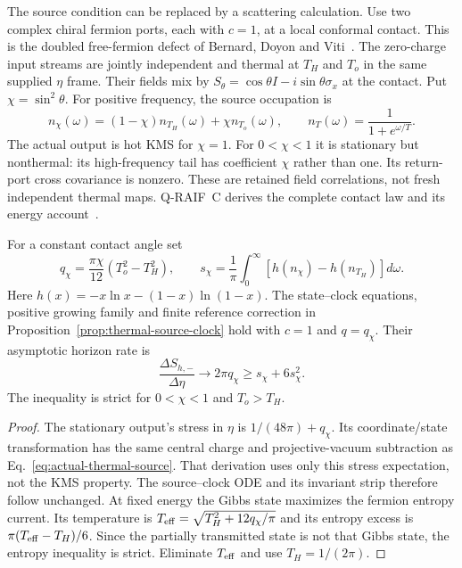 The source condition can be replaced by a scattering calculation. Use
two complex chiral fermion ports, each with $c=1$, at a local conformal
contact. This is the doubled free-fermion defect of
Bernard, Doyon and Viti~\cite[Sections~3 and 5]{BernardDoyonViti2015}.
The zero-charge input streams are jointly independent and thermal at
$T_H$ and $T_o$ in the same supplied $\eta$ frame. Their fields mix by
$S_\theta=\cos\theta I-i\sin\theta\sigma_x$ at the contact. Put
$\chi=\sin^2\theta$. For positive frequency, the source occupation is
\begin{equation}\label{eq:local-source-occupation}
 n_\chi(\omega)=(1-\chi)n_{T_H}(\omega)+\chi n_{T_o}(\omega),\qquad
 n_T(\omega)=\frac1{1+e^{\omega/T}}.
\end{equation}
The actual output is hot KMS for $\chi=1$. For $0<\chi<1$ it is
stationary but nonthermal: its high-frequency tail has coefficient
$\chi$ rather than one. Its return-port cross covariance is nonzero.
These are retained field correlations, not fresh independent thermal
maps. Q-RAIF~C derives the complete contact law and its energy
account~\cite[Section on a local thermal contact]{QRC}.

\begin{proposition}
\label{prop:nonthermal-source-clock}
For a constant contact angle set
\begin{equation}\label{eq:local-source-charge}
 q_\chi=\frac{\pi\chi}{12}(T_o^2-T_H^2),\qquad
 s_\chi=\frac1\pi\int_0^\infty
       [h(n_\chi)-h(n_{T_H})]d\omega.
\end{equation}
Here $h(x)=-x\ln x-(1-x)\ln(1-x)$.
The state--clock equations, positive growing family and finite reference
correction in Proposition~\ref{prop:thermal-source-clock} hold with
$c=1$ and $q=q_\chi$. Their asymptotic horizon rate is
\begin{equation}\label{eq:nonthermal-horizon-rate}
 \frac{\Delta S_{h,-}}{\Delta\eta}\longrightarrow2\pi q_\chi
       \ge s_\chi+6s_\chi^2.
\end{equation}
The inequality is strict for $0<\chi<1$ and $T_o>T_H$.
\end{proposition}
\begin{proof}
The stationary output's stress in $\eta$ is
$1/(48\pi)+q_\chi$. Its coordinate/state transformation has the same
central charge and projective-vacuum subtraction as
Eq.~\eqref{eq:actual-thermal-source}. That derivation uses only this
stress expectation, not the KMS property. The source--clock ODE and
its invariant strip therefore follow unchanged. At fixed energy the
Gibbs state maximizes the fermion entropy current. Its temperature is
$T_{\rm eff}=\sqrt{T_H^2+12q_\chi/\pi}$ and its entropy excess is
$\pi(T_{\rm eff}-T_H)/6$. Since the partially transmitted state is not
that Gibbs state, the entropy inequality is strict. Eliminate
$T_{\rm eff}$ and use $T_H=1/(2\pi)$.
\end{proof}

